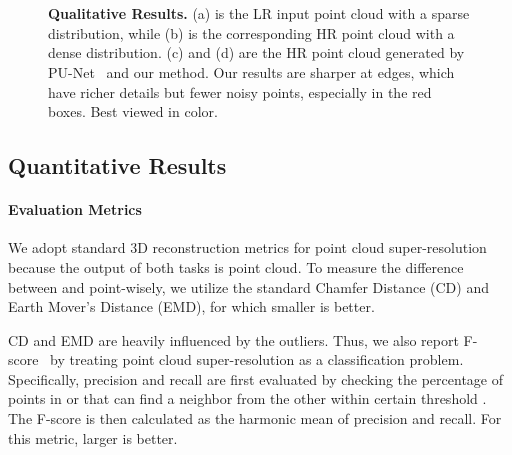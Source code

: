 \documentclass[10pt,twocolumn,letterpaper]{article}
\begin{document}
\begin{figure*}
\captionsetup[subfigure]{labelformat=empty}
\begin{center}
	\hfill
	\hfill
	\hfill
	\\
	\hfill
	\hfill
	\hfill
	\\
\end{center}
	\vspace{-1.5em}
	\caption{\textbf{Qualitative Results.} (a) is the LR input point cloud with a sparse distribution, while (b) is the corresponding HR point cloud with a dense distribution. (c) and (d) are the HR point cloud generated by PU-Net~\cite{yu2018pu} and our method. Our results are sharper at edges, which have richer details but fewer noisy points, especially in the red boxes. Best viewed in color.}
	\label{fig:visual}
\end{figure*}

\subsection{Quantitative Results}
\paragraph{Evaluation Metrics}
We adopt standard 3D reconstruction metrics for point cloud super-resolution because the output of both tasks is point cloud.
To measure the difference between  and  point-wisely, we utilize the standard Chamfer Distance (CD) and Earth Mover's Distance (EMD), for which smaller is better.

CD and EMD are heavily influenced by the outliers.
Thus, we also report F-score~\cite{sokolova2006beyond} by treating point cloud super-resolution as a classification problem.
Specifically, precision and recall are first evaluated by checking the percentage of points in  or  that can find a neighbor from the other within certain threshold .
The F-score is then calculated as the harmonic mean of precision and recall.
For this metric, larger is better.
\end{document}
